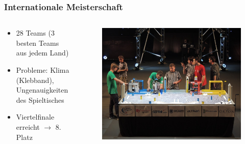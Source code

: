 \begin{frame}
	\frametitle{Internationale Meisterschaft}
	
	\vspace{-3em}
	
	\begin{columns}[t]
		\begin{column}{0.45\textwidth}
			\begin{center}
				\begin{itemize}
					\item 28 Teams (3 besten Teams aus jedem Land)
					\item Probleme: Klima (Klebband), Ungenauigkeiten des Spieltisches
					\item Viertelfinale erreicht $\rightarrow$ 8. Platz
				\end{itemize}
			\end{center}
		\end{column}
		\begin{column}{0.55\textwidth}
			\begin{figure}
				\includegraphics[width=0.9\columnwidth]{../images/presentation/international.jpg}
			\end{figure}
		\end{column}
	\end{columns}
	
\end{frame}